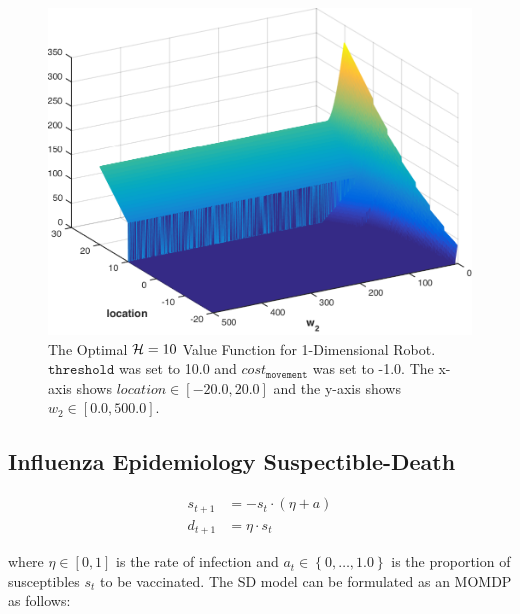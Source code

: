 \begin{figure}[h!]
    \centering
    \includegraphics[width=0.9\linewidth, height=0.8\linewidth]{images/robot1d}
    \caption{The Optimal $ \mathcal{H} = 10 $ Value Function for 1-Dimensional Robot. $ \mathtt{threshold} $ was set to 10.0 and $ cost_{\mathtt{movement}} $ was set to -1.0. The x-axis shows $ location \in \left[ -20.0, 20.0 \right]$ and the y-axis shows $ w_2 \in \left[ 0.0, 500.0 \right]$. }
    \label{fig:robot1d}
\end{figure}

\subsection{Influenza Epidemiology Suspectible-Death}
\label{sec:results_sd}

\begin{align*}
    s_{t + 1} &= - s_t \cdot ( \eta + a ) \\
    d_{t+1} &= \eta \cdot s_t 
\end{align*}

where {\footnotesize $ \eta \in [0, 1]$} is the rate of infection and {\footnotesize $ a_t \in \left\lbrace 0, \ldots, 1.0\right\rbrace $} is the proportion of susceptibles {\footnotesize $ s_t $} to be vaccinated. The SD model can be formulated as an MOMDP as follows:

